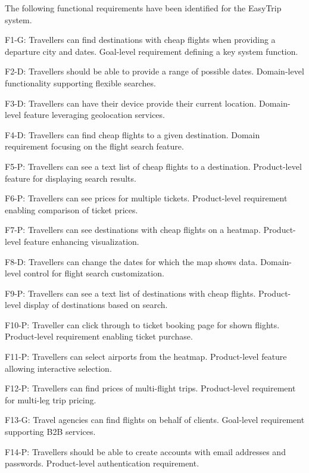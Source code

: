 The following functional requirements have been identified for the EasyTrip system.

F1-G: Travellers can find destinations with cheap flights when providing a departure city and dates.
    Goal-level requirement defining a key system function.
    
F2-D: Travellers should be able to provide a range of possible dates.
    Domain-level functionality supporting flexible searches.
    
F3-D: Travellers can have their device provide their current location.
    Domain-level feature leveraging geolocation services.
    
F4-D: Travellers can find cheap flights to a given destination.
    Domain requirement focusing on the flight search feature.
    
F5-P: Travellers can see a text list of cheap flights to a destination.
    Product-level feature for displaying search results.
    
F6-P: Travellers can see prices for multiple tickets.
    Product-level requirement enabling comparison of ticket prices.

F7-P: Travellers can see destinations with cheap flights on a heatmap.
    Product-level feature enhancing visualization.

F8-D: Travellers can change the dates for which the map shows data.
    Domain-level control for flight search customization.

F9-P: Travellers can see a text list of destinations with cheap flights.
    Product-level display of destinations based on search.

F10-P: Traveller can click through to ticket booking page for shown flights.
    Product-level requirement enabling ticket purchase.

F11-P: Travellers can select airports from the heatmap.
    Product-level feature allowing interactive selection.

F12-P: Travellers can find prices of multi-flight trips.
    Product-level requirement for multi-leg trip pricing.

F13-G: Travel agencies can find flights on behalf of clients.
    Goal-level requirement supporting B2B services.

F14-P: Travellers should be able to create accounts with email addresses and passwords.
    Product-level authentication requirement.

